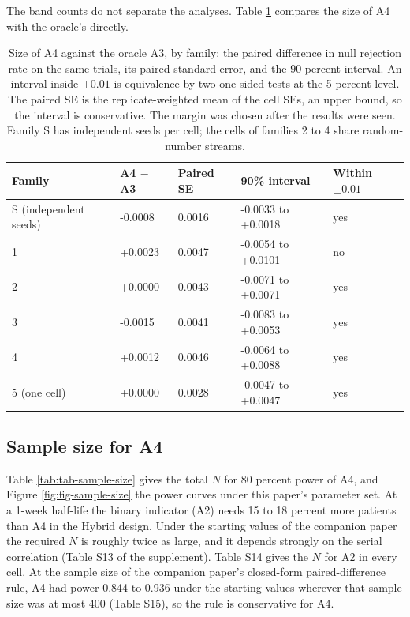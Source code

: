 \documentclass[
  11pt,
]{article}
\begin{document}
The band counts do not separate the analyses. Table
\ref{tab:tab-size-equiv} compares the size of A4 with the oracle's
directly.

\begin{table}
\centering
\caption{\label{tab:tab-size-equiv}Size of A4 against the oracle A3, by family: the paired
    difference in null rejection rate on the same trials, its paired
    standard error, and the 90 percent interval. An interval inside
    $\pm 0.01$ is equivalence by two one-sided tests at the 5 percent
    level. The paired SE is the replicate-weighted mean of the cell
    SEs, an upper bound, so the interval is conservative. The margin
    was chosen after the results were seen. Family S has
    independent seeds per cell; the cells of families 2 to 4 share
    random-number streams.}
\centering
\fontsize{8}{10}\selectfont
\begin{tabular}[t]{lllll}
\toprule
Family & A4 $-$ A3 & Paired SE & 90\% interval & Within $\pm 0.01$\\
\midrule
S (independent seeds) & -0.0008 & 0.0016 & -0.0033 to +0.0018 & yes\\
1 & +0.0023 & 0.0047 & -0.0054 to +0.0101 & no\\
2 & +0.0000 & 0.0043 & -0.0071 to +0.0071 & yes\\
3 & -0.0015 & 0.0041 & -0.0083 to +0.0053 & yes\\
4 & +0.0012 & 0.0046 & -0.0064 to +0.0088 & yes\\
5 (one cell) & +0.0000 & 0.0028 & -0.0047 to +0.0047 & yes\\
\bottomrule
\end{tabular}
\end{table}

\subsection*{Sample size for A4}\label{sample-size-for-a4}

Table \ref{tab:tab-sample-size} gives the total \(N\) for 80 percent
power of A4, and Figure \ref{fig:fig-sample-size} the power curves
under this paper's parameter set. At a 1-week half-life the binary
indicator (A2) needs 15 to 18 percent more patients than
A4 in the Hybrid design. Under the starting values of the companion
paper the required \(N\) is roughly twice as large, and it depends
strongly on the serial correlation (Table S13 of the supplement).
Table S14 gives the \(N\) for A2 in every cell. At the sample size of
the companion paper's closed-form paired-difference rule, A4 had
power 0.844 to 0.936 under
the starting values wherever that sample size was at most 400 (Table
S15), so the rule is conservative for A4.
\end{document}
